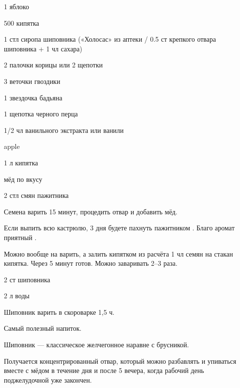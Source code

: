 {
\item 1 яблоко
\item 500 кипятка
\item 1 стл сиропа шиповника («Холосас» из аптеки / 0.5 ст крепкого отвара шиповника + 1 чл сахара)

}{
\item 2 палочки корицы или 2 щепотки
\item 3 веточки гвоздики
\item 1 звездочка бадьяна
\item 1 щепотка черного перца
\item 1/2 чл ванильного экстракта или ванили
}{%
}{}{apple}




{
\item 1 л кипятка
\item мёд по вкусу
}{
\item 2 стл смян пажитника
}{
Семена варить 15 минут, процедить отвар и добавить мёд.
}{
\begin{advice}
\item Если выпить всю кастрюлю, 3 дня будете пахнуть пажитником \faSmileO. Благо аромат приятный \faSmileO.
\item Можно вообще на варить, а залить кипятком из расчёта 1 чл семян на стакан кипятка. Через 5 минут готов. Можно заваривать 2–3 раза. 
\end{advice}}{}



{
\item 2 ст шиповника
\item 2 л воды
}{
\item[] 
}{
Шиповник варить в скороварке 1,5 ч.
}{
\begin{advice}
    \item Самый полезный напиток.
    \item Шиповник — классическое желчегонное наравне с брусникой.
\item Получается концентрированный отвар, который можно разбавлять и упиваться вместе с мёдом в течение дня и после 5 вечера, когда рабочий день поджелудочной уже закончен. 

\end{advice}}{}






